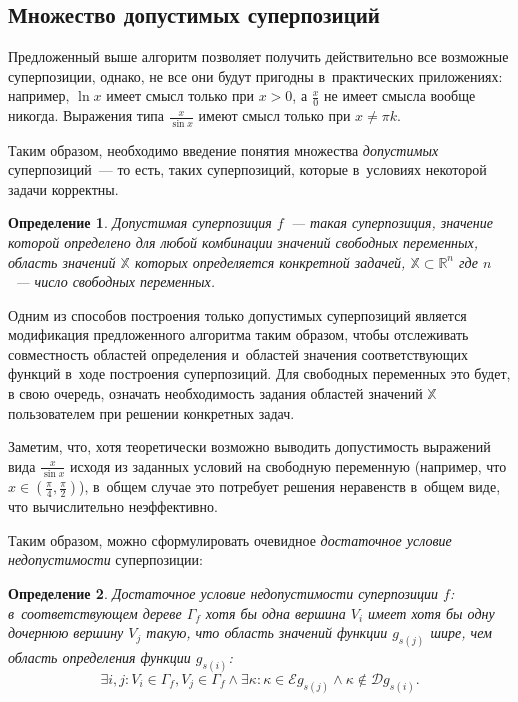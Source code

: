 \documentclass[12pt,a4paper]{article}
\newtheorem{defin}{Определение}
\begin{document}
\subsection{Множество допустимых суперпозиций}

Предложенный выше алгоритм позволяет получить действительно все возможные
суперпозиции, однако, не все они будут пригодны в~практических приложениях:
например, $\ln x$ имеет смысл только при $x > 0$, а $\frac{x}{0}$ не имеет
смысла вообще никогда. Выражения типа $\frac{x}{\sin x}$ имеют смысл только
при $x \neq \pi k$.

Таким образом, необходимо введение понятия множества \emph{допустимых}
суперпозиций~--- то есть, таких суперпозиций, которые в~условиях некоторой
задачи корректны.

\begin{defin}
  Допустимая суперпозиция $f$~--- такая суперпозиция, значение которой
  определено для любой комбинации значений свободных переменных, область
  значений $\mathbb{X}$ которых определяется конкретной задачей,
  $\mathbb{X} \subset \mathbb{R}^n$ где $n$~--- число свободных переменных.
\end{defin}

Одним из способов построения только допустимых суперпозиций является
модификация предложенного алгоритма таким образом, чтобы отслеживать
совместность областей определения и~областей значения соответствующих
функций в~ходе построения суперпозиций. Для свободных переменных это будет,
в свою очередь, означать необходимость задания областей значений
$\mathbb{X}$ пользователем при решении конкретных задач.

Заметим, что, хотя теоретически возможно выводить допустимость выражений
вида $\frac{x}{\sin x}$ исходя из заданных условий на свободную переменную
(например, что $x \in (\frac{\pi}{4}, \frac{\pi}{2})$), в~общем случае это
потребует решения неравенств в~общем виде, что вычислительно неэффективно.

Таким образом, можно сформулировать очевидное \emph{достаточное условие
недопустимости} суперпозиции:

\begin{defin}
  \label{defin:suff_not_allowed}
  Достаточное условие недопустимости суперпозиции $f$: в~соответствующем дереве
  $\Gamma_f$ хотя бы одна вершина $V_i$ имеет хотя бы одну дочернюю вершину
  $V_j$ такую, что область значений функции $g_{s(j)}$ шире, чем область
  определения функции $g_{s(i)}$:
  \[
  \exists i, j : V_i \in \Gamma_f, V_j \in \Gamma_f \wedge \exists \kappa :
	\kappa \in \mathcal{E} g_{s(j)} \wedge \kappa \notin \mathcal{D} g_{s(i)}.
  \]
\end{defin}
\end{document}
